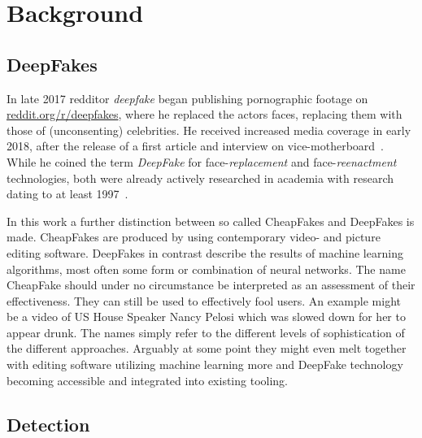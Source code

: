\section{Background}\label{sect:background}
\subsection{DeepFakes}\label{subsect:deepfakes}
In late 2017 \gls{redditor} \textit{deepfake} began publishing pornographic footage
on \url{reddit.org/r/deepfakes}, where he replaced the actors faces, replacing
them with those of (unconsenting) celebrities. He received increased media coverage
in early 2018, after the release of a first article and interview on
vice-motherboard~\cite{Cole.2017}. While he coined the term \textit{DeepFake}
for face-\textit{replacement} and face-\textit{reenactment} technologies, both
were already actively researched in academia with research dating to at least
1997~\cite{Bregler.1997}.

\par
In this work a further distinction between so called CheapFakes and DeepFakes is
made. CheapFakes are produced by using contemporary video- and picture editing
software. DeepFakes in contrast describe the results of machine learning algorithms,
most often some form or combination of neural networks. The name CheapFake should
under no circumstance be interpreted as an assessment of their effectiveness.
They can still be used to effectively fool users. An example might be a video
of US House Speaker Nancy Pelosi which was slowed down for her to appear drunk.
The names simply refer to the different levels of sophistication of the different
approaches. Arguably at some point they might even melt together with editing software
utilizing machine learning more and DeepFake technology becoming accessible and
integrated into existing tooling.
\subsection{Detection}
